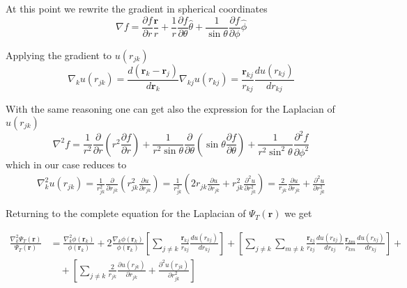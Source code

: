 \documentclass{article}
\begin{document}
At this point we rewrite the gradient in spherical coordinates
\begin{equation*}
    \nabla f = \frac{\partial f}{\partial r} \frac{\mathbf{r}}{r} + \frac{1}{r} \frac{\partial f}{\partial \theta} \hat{\theta} + \frac{1}{\sin \theta} \frac{\partial f}{\partial \phi} \hat{\phi}
\end{equation*}

Applying the gradient to $u(r_{jk})$
\begin{equation*}
    \nabla_k u(r_{jk}) = \frac{ d (\mathbf{r}_k - \mathbf{r}_j)}{d \mathbf{r}_k} \nabla_{kj} u(r_{kj}) = \frac{\mathbf{r}_{kj}}{r_{kj}} \frac{du(r_{kj})}{dr_{kj}}
\end{equation*}

With the same reasoning one can get also the expression for the Laplacian of $u(r_{jk})$
\begin{equation*}
    \nabla^2 f = \frac{1}{r^2} \frac{\partial}{\partial r} \left( r^2 \frac{\partial f}{\partial r} \right) + \frac{1}{r^2 \sin\theta } \frac{\partial }{\partial\theta} \left( \sin \theta \frac{\partial f}{\partial \theta} \right) + \frac{1}{r^2 \sin^2 \theta} \frac{\partial^2 f}{\partial \phi^2}
\end{equation*}
which in our case reduces to
\begin{align*}
    \nabla_k^2 u(r_{jk}) = \frac{1}{r_{jk}^2} \frac{\partial}{\partial r_{jk}} \left( r_{jk}^2 \frac{\partial u}{\partial r_{jk}} \right) = \frac{1}{r_{jk}^2}  \left( 2 r_{jk} \frac{\partial u}{\partial r_{jk}} + r_{jk}^2 \frac{\partial^2 u}{\partial r_{jk}^2} \right) = \frac{2}{r_{jk}} \frac{\partial u}{\partial r_{jk}} + \frac{\partial^2 u}{\partial r_{jk}^2}
\end{align*}

Returning to the complete equation for the Laplacian of $\Psi_T(\mathbf{r})$ we get

\begin{align*}
     \frac{ \nabla_k^2 \Psi_T(\mathbf{r})}{\Psi_T(\mathbf{r})} &=  \frac{\nabla_k^2 \phi(\mathbf{r}_k)}{\phi(\mathbf{r}_k)} + 2 \frac{\nabla_k \phi(\mathbf{r}_k)}{\phi(\mathbf{r}_k)} \left[ \sum_{j\neq k}  \frac{\mathbf{r}_{kj}}{r_{kj}} \frac{du(r_{kj})}{dr_{kj}} \right] + \left[ \sum_{j\neq k} \sum_{m \neq k} \frac{\mathbf{r}_{kj}}{r_{kj}} \frac{du(r_{kj})}{dr_{kj}} \frac{\mathbf{r}_{km}}{r_{km}} \frac{du(r_{kj})}{dr_{kj}} \right] + \\
     &\quad + \left[ \sum_{j\neq k} \frac{2}{r_{jk}} \frac{\partial u(r_{jk})}{\partial r_{jk}} + \frac{\partial^2 u(r_{jk})}{\partial r_{jk}^2} \right]
\end{align*}
\end{document}
